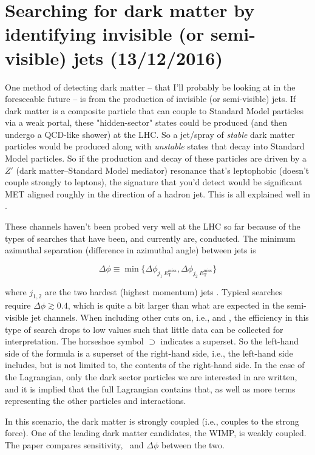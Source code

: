 \newpage
\section{Searching for dark matter by identifying invisible (or semi-visible) jets (13/12/2016)}
\label{sec:svjoverview}

One method of detecting dark matter -- that I'll probably be looking at in the foreseeable future -- is from the production of invisible (or semi-visible) jets. If dark matter is a composite particle that can couple to Standard Model particles via a weak portal, these "hidden-sector" states could be produced (and then undergo a QCD-like shower) at the LHC. So a jet/spray of \emph{stable} dark matter particles would be produced along with \emph{unstable} states that decay into Standard Model particles. So if the production and decay of these particles are driven by a $Z'$ (dark matter--Standard Model mediator) resonance that's leptophobic (doesn't couple strongly to leptons), the signature that you'd detect would be significant MET aligned roughly in the direction of a hadron jet. This is all explained well in \cite{Cohen:2015toa}.

These channels haven't been probed very well at the LHC so far because of the types of searches that have been, and currently are, conducted. The minimum azimuthal separation (difference in azimuthal angle) between jets is

\begin{equation}
\Delta\phi \equiv \min \{ \Delta\phi_{j_1 \ E_{\mathrm{T}}^{\mathrm{miss}}}, \Delta\phi_{j_2 \ E_{\mathrm{T}}^{\mathrm{miss}}} \}
\end{equation}

where $j_{1, 2}$ are the two hardest (highest momentum) jets \cite{Cohen:2015toa}. Typical searches require $\Delta\phi \gtrsim 0.4$, which is quite a bit larger than what are expected in the semi-visible jet channels. When including other cuts on, i.e., \etmiss and \alphat, the efficiency in this type of search drops to low values such that little data can be collected for interpretation. The horseshoe symbol $\supset$ indicates a superset. So the left-hand side of the formula is a superset of the right-hand side, i.e., the left-hand side includes, but is not limited to, the contents of the right-hand side. In the case of the Lagrangian, only the dark sector particles we are interested in are written, and it is implied that the full Lagrangian contains that, as well as more terms representing the other particles and interactions.

In this scenario, the dark matter is strongly coupled (i.e., couples to the strong force). One of the leading dark matter candidates, the WIMP, is weakly coupled. The paper compares sensitivity, \etmiss\ and $\Delta\phi$ between the two.

